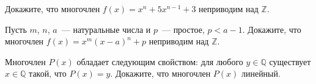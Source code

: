 


\begin{problems}

\item
Докажите, что многочлен $f(x) = x^{n} + 5 x^{n-1} + 3$ неприводим
над $\mathbb{Z}$.

\item
Пусть $m$, $n$, $a$~--- натуральные числа и $p$~--- простое, $p < a - 1$.
Докажите, что многочлен $f(x) = x^{m} (x - a)^{n} + p$ неприводим
над $\mathbb{Z}$.

\item
Многочлен $P(x)$ обладает следующим свойством: для любого $y \in \mathbb{Q}$
существует $x \in \mathbb{Q}$ такой, что $P(x) = y$.
Докажите, что многочлен $P(x)$ линейный.

\end{problems}


